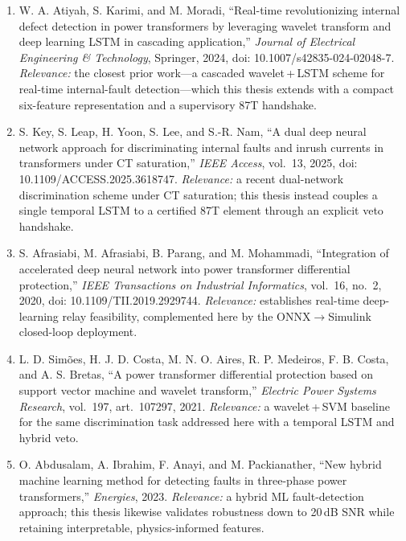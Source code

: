 \documentclass[12pt,a4paper,oneside]{report}
\begin{document}
\begin{enumerate}[leftmargin=1.6em,itemsep=6pt]
\item W. A. Atiyah, S. Karimi, and M. Moradi, ``Real-time revolutionizing internal defect detection in power transformers by leveraging wavelet transform and deep learning LSTM in cascading application,'' \textit{Journal of Electrical Engineering \& Technology}, Springer, 2024, doi: 10.1007/s42835-024-02048-7. \textit{Relevance:} the closest prior work---a cascaded wavelet\,+\,LSTM scheme for real-time internal-fault detection---which this thesis extends with a compact six-feature representation and a supervisory 87T handshake.
\item S. Key, S. Leap, H. Yoon, S. Lee, and S.-R. Nam, ``A dual deep neural network approach for discriminating internal faults and inrush currents in transformers under CT saturation,'' \textit{IEEE Access}, vol.~13, 2025, doi: 10.1109/ACCESS.2025.3618747. \textit{Relevance:} a recent dual-network discrimination scheme under CT saturation; this thesis instead couples a single temporal LSTM to a certified 87T element through an explicit veto handshake.
\item S. Afrasiabi, M. Afrasiabi, B. Parang, and M. Mohammadi, ``Integration of accelerated deep neural network into power transformer differential protection,'' \textit{IEEE Transactions on Industrial Informatics}, vol.~16, no.~2, 2020, doi: 10.1109/TII.2019.2929744. \textit{Relevance:} establishes real-time deep-learning relay feasibility, complemented here by the ONNX$\to$Simulink closed-loop deployment.
\item L. D. Sim\~oes, H. J. D. Costa, M. N. O. Aires, R. P. Medeiros, F. B. Costa, and A. S. Bretas, ``A power transformer differential protection based on support vector machine and wavelet transform,'' \textit{Electric Power Systems Research}, vol.~197, art.\ 107297, 2021. \textit{Relevance:} a wavelet\,+\,SVM baseline for the same discrimination task addressed here with a temporal LSTM and hybrid veto.
\item O. Abdusalam, A. Ibrahim, F. Anayi, and M. Packianather, ``New hybrid machine learning method for detecting faults in three-phase power transformers,'' \textit{Energies}, 2023. \textit{Relevance:} a hybrid ML fault-detection approach; this thesis likewise validates robustness down to 20\,dB SNR while retaining interpretable, physics-informed features.
\end{enumerate}
\end{document}
